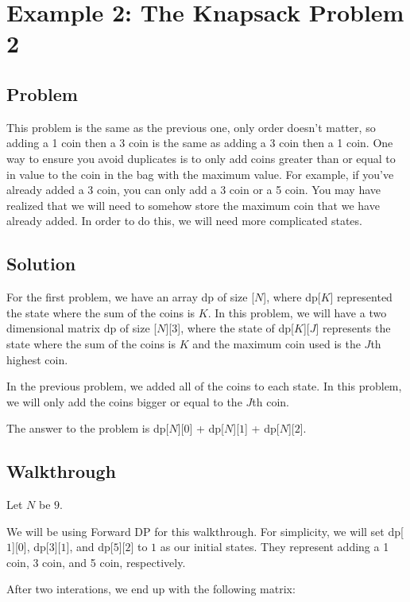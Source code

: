 \documentclass{article}
\begin{document}
\section{Example 2: The Knapsack Problem 2}
\subsection{Problem}
This problem is the same as the previous one, only order doesn't matter, so adding a 1 coin then a 3 coin is the same as adding a 3 coin then a 1 coin. One way to ensure you avoid duplicates is to only add coins greater than or equal to in value to the coin in the bag with the maximum value. For example, if you've already added a 3 coin, you can only add a 3 coin or a 5 coin. You may have realized that we will need to somehow store the maximum coin that we have already added. In order to do this, we will need more complicated states.

\subsection{Solution}
For the first problem, we have an array dp of size [$N$], where dp[$K$] represented the state where the sum of the coins is $K$. In this problem, we will have a two dimensional matrix dp of size [$N$][$3$], where the state of dp[$K$][$J$] represents the state where the sum of the coins is $K$ and the maximum coin used is the $J$th highest coin. 

In the previous problem, we added all of the coins to each state. In this problem, we will only add the coins bigger or equal to the $J$th coin.

The answer to the problem is dp[$N$][$0$] + dp[$N$][$1$] + dp[$N$][$2$].

\subsection{Walkthrough}
Let $N$ be $9.$

We will be using Forward DP for this walkthrough. For simplicity, we will set dp[$1$][$0$], dp[$3$][$1$], and dp[$5$][$2$] to $1$ as our initial states. They represent adding a 1 coin, 3 coin, and 5 coin, respectively. 

After two interations, we end up with the following matrix:
\end{document}

